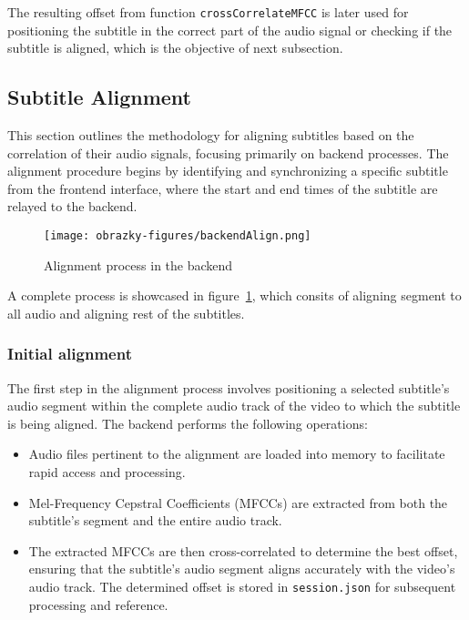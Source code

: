 The resulting offset from function \texttt{crossCorrelateMFCC} is later used for positioning the subtitle in the correct part of the audio signal or checking if the subtitle is aligned, which is the objective of next subsection.


\subsection{Subtitle Alignment}

This section outlines the methodology for aligning subtitles based on the correlation of their audio signals, focusing primarily on backend processes. The alignment procedure begins by identifying and synchronizing a specific subtitle from the frontend interface, where the start and end times of the subtitle are relayed to the backend.

\begin{figure}[h]
    \centering
    \texttt{[image: obrazky-figures/backendAlign.png]}
    \caption{Alignment process in the backend}
    \label{fig:align:backend}
\end{figure}

A complete process is showcased in figure~\ref{fig:align:backend}, which consits of 
aligning segment to all audio and aligning rest of the subtitles.

\subsubsection{Initial alignment}

The first step in the alignment process involves positioning a selected subtitle's audio segment within the complete audio track of the video to which the subtitle is being aligned. The backend performs the following operations:
\begin{itemize}
\item Audio files pertinent to the alignment are loaded into memory to facilitate rapid access and processing.
\item Mel-Frequency Cepstral Coefficients (MFCCs) are extracted from both the subtitle's segment and the entire audio track.
\item The extracted MFCCs are then cross-correlated to determine the best offset, ensuring that the subtitle's audio segment aligns accurately with the video's audio track. The determined offset is stored in \texttt{session.json} for subsequent processing and reference.
\end{itemize}


